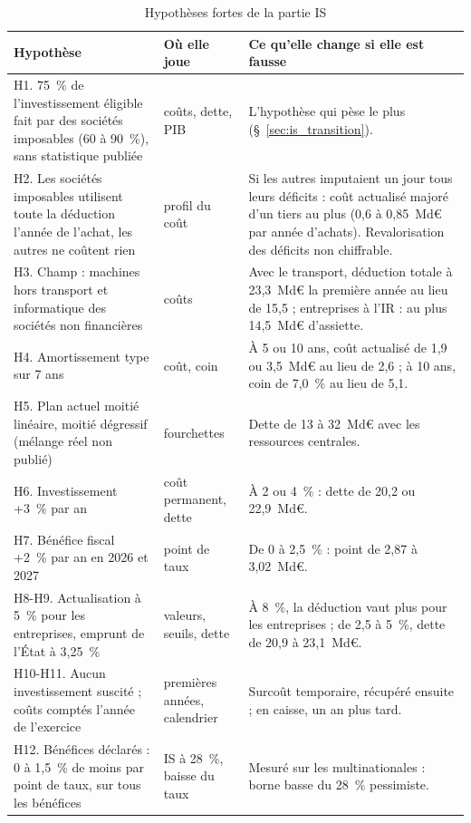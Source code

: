 \documentclass[11pt,a4paper]{article}
\begin{document}
\begin{table}[!htbp]\centering\scriptsize
\caption{Hypothèses fortes de la partie IS}\label{tab:is_hyp1}
\begin{tabularx}{\linewidth}{@{}>{\raggedright\arraybackslash}p{4.4cm}>{\raggedright\arraybackslash}p{2.4cm}>{\raggedright\arraybackslash}X@{}}
\toprule
Hypothèse & Où elle joue & Ce qu'elle change si elle est fausse \\
\midrule
H1. 75~\% de l'investissement éligible fait par des sociétés imposables (60 à 90~\%), sans statistique publiée & coûts,
dette, PIB & L'hypothèse qui pèse le plus (§~\ref{sec:is_transition}). \\
H2. Les sociétés imposables utilisent toute la déduction l'année de l'achat, les autres ne coûtent rien & profil du
coût & Si les autres imputaient un jour tous leurs déficits : coût actualisé majoré d'un tiers au plus (0,6 à
0,85~Md€ par année d'achats). Revalorisation des déficits non chiffrable. \\
H3. Champ : machines hors transport et informatique des sociétés non financières & coûts & Avec le transport,
déduction totale à 23,3~Md€ la première année au lieu de 15,5 ; entreprises à l'IR : au plus 14,5~Md€ d'assiette. \\
H4. Amortissement type sur 7 ans & coût, coin & À 5 ou 10 ans, coût actualisé de 1,9 ou 3,5~Md€ au lieu de 2,6 ; à 10
ans, coin de 7,0~\% au lieu de 5,1. \\
H5. Plan actuel moitié linéaire, moitié dégressif (mélange réel non publié) & fourchettes & Dette de 13 à 32~Md€ avec
les ressources centrales. \\
H6. Investissement +3~\% par an & coût permanent, dette & À 2 ou 4~\% : dette de 20,2 ou 22,9~Md€. \\
H7. Bénéfice fiscal +2~\% par an en 2026 et 2027 & point de taux & De 0 à 2,5~\% : point de 2,87 à 3,02~Md€. \\
H8-H9. Actualisation à 5~\% pour les entreprises, emprunt de l'État à 3,25~\% & valeurs, seuils, dette & À 8~\%, la
déduction vaut plus pour les entreprises ; de 2,5 à 5~\%, dette de 20,9 à 23,1~Md€. \\
H10-H11. Aucun investissement suscité ; coûts comptés l'année de l'exercice & premières années, calendrier & Surcoût
temporaire, récupéré ensuite ; en caisse, un an plus tard. \\
H12. Bénéfices déclarés : 0 à 1,5~\% de moins par point de taux, sur tous les bénéfices & IS à 28~\%, baisse du taux &
Mesuré sur les multinationales : borne basse du 28~\% pessimiste. \\

\end{tabularx}
\end{table}
\end{document}
